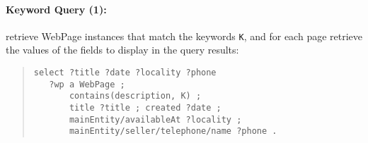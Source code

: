 \paragraph{Keyword Query (1):} retrieve WebPage instances that match the keywords \verb|K|, and for each page retrieve the values of the fields to display in the query results:
\begin{quote}
{\footnotesize
\begin{verbatim}
select ?title ?date ?locality ?phone
   ?wp a WebPage ; 
       contains(description, K) ;   
       title ?title ; created ?date ;
       mainEntity/availableAt ?locality ;
       mainEntity/seller/telephone/name ?phone .
\end{verbatim}}
\end{quote}

